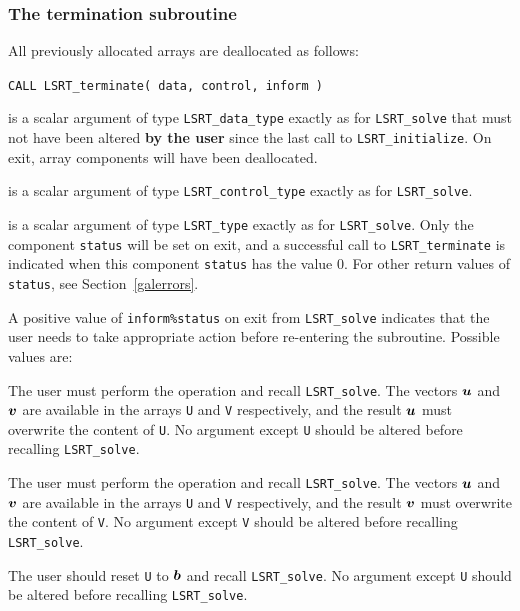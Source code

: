 \documentclass{galahad}
\newcommand{\packagename}{LS\-RT}
\begin{document}

\subsubsection{The  termination subroutine}
All previously allocated arrays are deallocated as follows:

\hskip0.5in
{\tt CALL \packagename\_terminate( data, control, inform )}

\begin{description}

 is a scalar \intentinout argument of type
{\tt \packagename\_data\_type}
exactly as for
{\tt \packagename\_solve}
that must not have been altered {\bf by the user} since the last call to
{\tt \packagename\_initialize}.
On exit, array components will have been deallocated.

 is a scalar \intentin argument of type
{\tt \packagename\_control\_type}
exactly as for
{\tt \packagename\_solve}.

 is a scalar \intentout argument of type {\tt \packagename\_type}
exactly as for
{\tt \packagename\_solve}.
Only the component {\tt status} will be set on exit, and a
successful call to
{\tt \packagename\_terminate}
is indicated when this  component {\tt status} has the value 0.
For other return values of {\tt status}, see Section~\ref{galerrors}.

\end{description}


\galreverse
A positive value of {\tt inform\%status} on exit from
{\tt \packagename\_solve} indicates that the user needs to take appropriate
action before re-entering the subroutine. Possible values are:

\begin{description}

 The user must perform the operation
\disp{\bmu := \bmu + \bmA \bmv,}
and recall {\tt \packagename\_solve}.
The vectors ${\bm{u}}$ and ${\bm{v}}$ are available in the arrays {\tt U}
and {\tt V} respectively, and the result
${\bm{u}}$ must overwrite the content of {\tt U}.
No argument except {\tt U} should be altered before recalling
{\tt \packagename\_solve}.

 The user must perform the operation
and recall {\tt \packagename\_solve}.
The vectors ${\bm{u}}$ and ${\bm{v}}$ are available in the arrays {\tt U}
and {\tt V} respectively, and the result
${\bm{v}}$ must overwrite the content of {\tt V}.
No argument except {\tt V} should be altered before recalling
{\tt \packagename\_solve}.

  The user should reset {\tt U} to ${\bm{b}}$ and recall
{\tt \packagename\_solve}.
No argument except {\tt U} should be altered before recalling
{\tt \packagename\_solve}.
\end{description}
\end{document}

